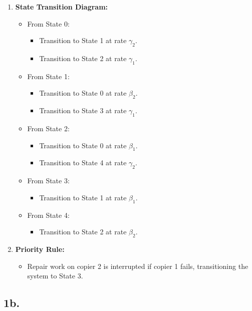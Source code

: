 \documentclass[12pt]{article}
\begin{document}
\begin{enumerate}
    \item \textbf{State Transition Diagram:}
    \begin{itemize}
        \item From State 0:
        \begin{itemize}
            \item Transition to State 1 at rate $\gamma_2$.
            \item Transition to State 2 at rate $\gamma_1$.
        \end{itemize}
        \item From State 1:
        \begin{itemize}
            \item Transition to State 0 at rate $\beta_2$.
            \item Transition to State 3 at rate $\gamma_1$.
        \end{itemize}
        \item From State 2:
        \begin{itemize}
            \item Transition to State 0 at rate $\beta_1$.
            \item Transition to State 4 at rate $\gamma_2$.
        \end{itemize}
        \item From State 3:
        \begin{itemize}
            \item Transition to State 1 at rate $\beta_1$.
        \end{itemize}
        \item From State 4:
        \begin{itemize}
            \item Transition to State 2 at rate $\beta_2$.
        \end{itemize}
    \end{itemize}

    \item \textbf{Priority Rule:}
    \begin{itemize}
        \item Repair work on copier 2 is interrupted if copier 1 fails, transitioning the system to State 3.
    \end{itemize}
\end{enumerate}

\subsection*{1b.}
\end{document}
